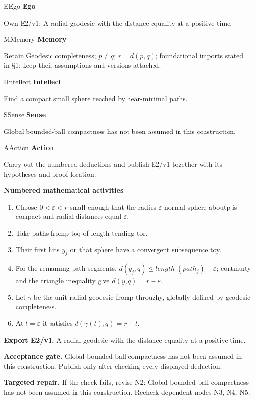 \documentclass[preprint,12pt,aps,pra,showkeys,amsmath,amssymb,superscriptaddress,floatfix]{revtex4-2}
\theoremstyle{definition}
\theoremstyle{remark}
\newcommand{\mmfaculty}[3]{%
 \begin{mmfacultybox}{#1}{#2}
 {\sffamily\bfseries\color{MMBlue}#2}\par\smallskip #3
 \end{mmfacultybox}}
\newcommand{\field}[2]{\par\smallskip\noindent\textbf{#1.} #2\par}
\begin{document}
\mmfaculty{E}{Ego}{Own E2/v1: A radial geodesic with the distance equality at a positive
time.}

\mmfaculty{M}{Memory}{Retain Geodesic completeness; \(p\ne q\); \(r=d(p,q)\); foundational
imports stated in §1; keep their assumptions and versions attached.}

\mmfaculty{I}{Intellect}{Find a compact small sphere reached by near-minimal paths.}

\mmfaculty{S}{Sense}{Global bounded-ball compactness has not been assumed in this
construction.}

\mmfaculty{A}{Action}{Carry out the numbered deductions and publish E2/v1 together with its
hypotheses and proof location.}

\smallskip\noindent\textbf{Numbered mathematical activities}

\begin{enumerate}[label=N2.\arabic*,leftmargin=3.4em]

\item Choose \(0<\varepsilon <r\) small enough that the radius-\(\varepsilon\)
normal sphere aboutp is compact and radial distances equal
\(\varepsilon\).

\item Take paths fromp toq of length tending tor.

\item Their first hits \(y_j\) on that sphere have a convergent subsequence
toy.

\item For the remaining path segments, \(d(y_j,q)\le length\)
\((path_j)-\varepsilon\); continuity and the triangle inequality give
\(d(y,q)=r-\varepsilon\).

\item Let \(\gamma\) be the unit radial geodesic fromp throughy, globally
defined by geodesic completeness.

\item At \(t=\varepsilon\) it satisfies \(d(\gamma (t),q)=r-t\).

\end{enumerate}

\field{Export E2/v1}{A radial geodesic with the distance equality at a positive time.}

\field{Acceptance gate}{Global bounded-ball compactness has not been assumed in this
construction. Publish only after checking every displayed deduction.}

\field{Targeted repair}{If the check fails, revise N2: Global bounded-ball compactness has not
been assumed in this construction. Recheck dependent nodes N3, N4, N5.}
\end{document}
